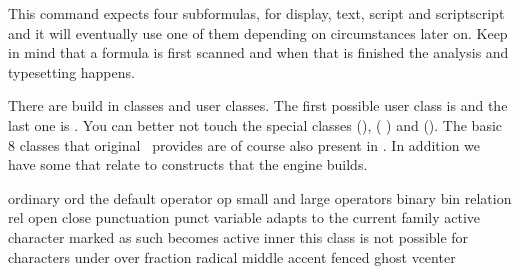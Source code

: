 This command expects four subformulas, for display, text, script and scriptscript
and it will eventually use one of them depending on circumstances later on. Keep
in mind that a formula is first scanned and when that is finished the analysis
and typesetting happens.

\stopoldprimitive

\startnewprimitive[title={\prm {mathclass}}]

There are build in classes and user classes. The first possible user class is
 and the last one is
. You can better not touch
the special classes  (\number \mathallcode),  (\number
\mathbegincode) and  (\number \mathendcode). The basic 8 classes that
original \TEX\ provides are of course also present in \LUAMETATEX. In addition we
have some that relate to constructs that the engine builds.

\starttabulate[|l|l|T|l|]
\FL
\NC ordinary        \NC ord    \NC \the\mathordinarycode    \NC the default \NR
\NC operator        \NC op     \NC \the\mathoperatorcode    \NC small and large operators \NC \NR
\NC binary          \NC bin    \NC \the\mathbinarycode      \NC \NC \NR
\NC relation        \NC rel    \NC \the\mathrelationcode    \NC \NC \NR
\NC open            \NC        \NC \the\mathopencode        \NC \NC \NR
\NC close           \NC        \NC \the\mathclosecode       \NC \NC \NR
\NC punctuation     \NC punct  \NC \the\mathpunctuationcode \NC \NC \NR
\NC variable        \NC        \NC \the\mathvariablecode    \NC adapts to the current family \NC \NR
\NC active          \NC        \NC \the\mathactivecode      \NC character marked as such becomes active \NR
\NC inner           \NC        \NC \the\mathinnercode       \NC this class is not possible for characters \NR
\ML
\NC under           \NC        \NC \the\mathundercode       \NC \NC \NR
\NC over            \NC        \NC \the\mathovercode        \NC \NC \NR
\NC fraction        \NC        \NC \the\mathfractioncode    \NC \NC \NR
\NC radical         \NC        \NC \the\mathradicalcode     \NC \NC \NR
\NC middle          \NC        \NC \the\mathmiddlecode      \NC \NC \NR
\NC accent          \NC        \NC \the\mathaccentcode      \NC \NC \NR
\NC fenced          \NC        \NC \the\mathfencedcode      \NC \NC \NR
\NC ghost           \NC        \NC \the\mathghostcode       \NC \NC \NR
\NC vcenter         \NC        \NC \the\mathvcentercode     \NC \NC \NR
\LL
\stoptabulate

